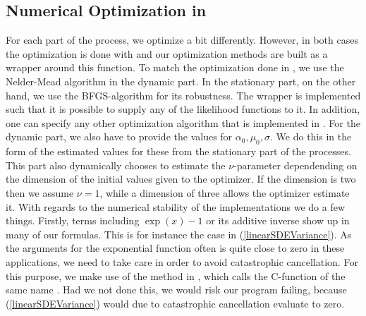\subsection{Numerical Optimization in }
For each part of the process, we optimize a bit differently. However, in both cases the optimization is done with  \cite{Rlang} and our optimization methods are built as a wrapper around this function. To match the optimization done in \cite{Ditlevsen2023}, we use the Nelder-Mead algorithm in the dynamic part. In the stationary part, on the other hand, we use the BFGS-algorithm for its robustness. The wrapper is implemented such that it is possible to supply any of the likelihood functions to it. In addition, one can specify any other optimization algorithm that is implemented in . For the dynamic part, we also have to provide the values for $\alpha_0, \mu_0, \sigma$. We do this in the form of the estimated values for these from the stationary part of the processes. This part also dynamically chooses to estimate the $\nu$-parameter dependending on the dimension of the initial values given to the optimizer. If the dimension is two then we assume $\nu = 1$, while a dimension of three allows the optimizer estimate it. With regards to the numerical stability of the implementations we do a few things. Firstly, terms including $\exp\left(x\right) - 1$ or its additive inverse show up in many of our formulas. This is for instance the case in (\ref{linearSDEVariance}). As the arguments for the exponential function often is quite close to zero in these applications, we need to take care in order to avoid catastrophic cancellation. For this purpose, we make use of the  method in , which calls the C-function of the same name \cite{cppreference_expm1}. Had we not done this, we would risk our program failing, because (\ref{linearSDEVariance}) would due to catastrophic cancellation evaluate to zero.
